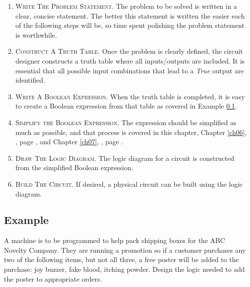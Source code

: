\begin{enumerate}
  \item \textsc{Write The Problem Statement}. The problem to be solved is written in a clear, concise statement. The better this statement is written the easier each of the following steps will be, so time spent polishing the problem statement is worthwhile. 
  
  \item \textsc{Construct A Truth Table}. Once the problem is clearly defined, the circuit designer constructs a truth table where all inputs/outputs are included. It is essential that all possible input combinations that lead to a \emph{True} output are identified. 
  
  \item \textsc{Write A Boolean Expression}. When the truth table is completed, it is easy to create a Boolean expression from that table as covered in Example \ref{05:subsec:example}. 
  
  \item \textsc{Simplify the Boolean Expression}. The expression should be simplified as much as possible, and that process is covered in this chapter, Chapter \ref{ch06}, , page \pageref{ch06}, and Chapter \ref{ch07}, , page \pageref{ch07}. 
  
  \item \textsc{Draw The Logic Diagram}. The logic diagram for a circuit is constructed from the simplified Boolean expression. 
  
  \item \textsc{Build The Circuit}. If desired, a physical circuit can be built using the logic diagram. 
\end{enumerate}

\subsection{Example}
\label{05:subsec:example}

A machine is to be programmed to help pack shipping boxes for the ABC Novelty Company. They are running a promotion so if a customer purchases any two of the following items, but not all three, a free poster will be added to the purchase: joy buzzer, fake blood, itching powder. Design the logic needed to add the poster to appropriate orders. 

